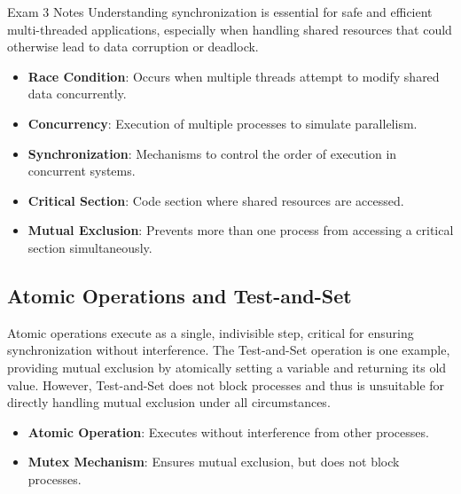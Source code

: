\begin{examnotes}{Exam 3 Notes}
    Understanding synchronization is essential for safe and efficient multi-threaded applications, especially when handling shared resources that could otherwise lead to data corruption or deadlock.
    
    \begin{highlight}
        \begin{itemize}
            \item \textbf{Race Condition}: Occurs when multiple threads attempt to modify shared data concurrently.
            \item \textbf{Concurrency}: Execution of multiple processes to simulate parallelism.
            \item \textbf{Synchronization}: Mechanisms to control the order of execution in concurrent systems.
            \item \textbf{Critical Section}: Code section where shared resources are accessed.
            \item \textbf{Mutual Exclusion}: Prevents more than one process from accessing a critical section simultaneously.
        \end{itemize}
    \end{highlight}
    
    \subsection*{Atomic Operations and Test-and-Set}
    
    Atomic operations execute as a single, indivisible step, critical for ensuring synchronization without interference. The Test-and-Set operation is one example, providing mutual exclusion by atomically 
    setting a variable and returning its old value. However, Test-and-Set does not block processes and thus is unsuitable for directly handling mutual exclusion under all circumstances.
    
    \begin{highlight}
        \begin{itemize}
            \item \textbf{Atomic Operation}: Executes without interference from other processes.
            \item \textbf{Mutex Mechanism}: Ensures mutual exclusion, but does not block processes.
        \end{itemize}
    \end{highlight}
    

\end{examnotes}
